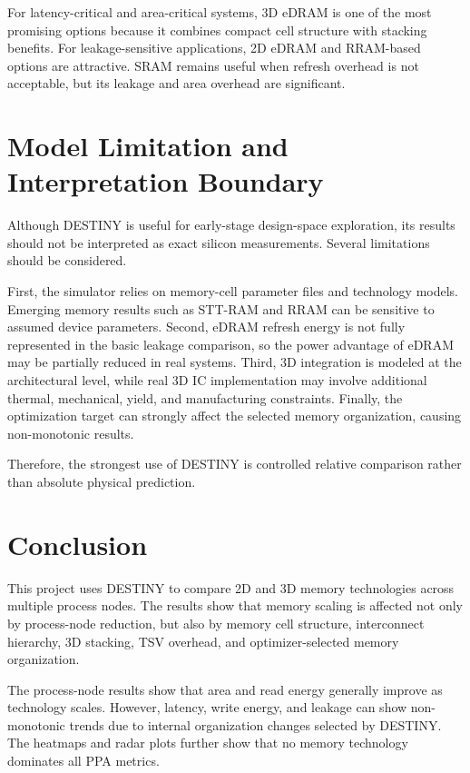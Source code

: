 \documentclass[conference]{IEEEtran}
\begin{document}
For latency-critical and area-critical systems, 3D eDRAM is one of the most promising options because it combines compact cell structure with stacking benefits. For leakage-sensitive applications, 2D eDRAM and RRAM-based options are attractive. SRAM remains useful when refresh overhead is not acceptable, but its leakage and area overhead are significant.

\section{Model Limitation and Interpretation Boundary}

Although DESTINY is useful for early-stage design-space exploration, its results should not be interpreted as exact silicon measurements. Several limitations should be considered.

First, the simulator relies on memory-cell parameter files and technology models. Emerging memory results such as STT-RAM and RRAM can be sensitive to assumed device parameters. Second, eDRAM refresh energy is not fully represented in the basic leakage comparison, so the power advantage of eDRAM may be partially reduced in real systems. Third, 3D integration is modeled at the architectural level, while real 3D IC implementation may involve additional thermal, mechanical, yield, and manufacturing constraints. Finally, the optimization target can strongly affect the selected memory organization, causing non-monotonic results.

Therefore, the strongest use of DESTINY is controlled relative comparison rather than absolute physical prediction.

\section{Conclusion}

This project uses DESTINY to compare 2D and 3D memory technologies across multiple process nodes. The results show that memory scaling is affected not only by process-node reduction, but also by memory cell structure, interconnect hierarchy, 3D stacking, TSV overhead, and optimizer-selected memory organization.

The process-node results show that area and read energy generally improve as technology scales. However, latency, write energy, and leakage can show non-monotonic trends due to internal organization changes selected by DESTINY. The heatmaps and radar plots further show that no memory technology dominates all PPA metrics.
\end{document}
